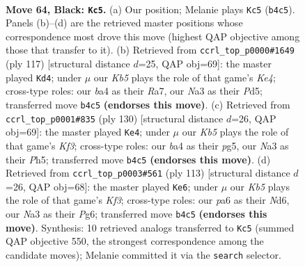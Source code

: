 \documentclass[11pt]{article}
\begin{document}
\clearpage

\begin{figure}[p]\centering
\begin{subfigure}{0.46\textwidth}\centering
\resizebox{\linewidth}{!}{%
\newchessgame
\chessboard[
  setfen={6r1/8/Pp6/5p2/Bk1R1P2/n2K4/8/8 b - - 12 64},
  showmover=false,
  pgfstyle=straightmove, color=movearrow, markmove={b4-c5}
]}
\caption{}
\end{subfigure}\hfill
\begin{subfigure}{0.46\textwidth}\centering
\resizebox{\linewidth}{!}{%
\newchessgame
\chessboard[
  setfen={8/r7/8/3pk3/7p/P3R2P/4K3/8 b - - 13 59},
  showmover=false,
  pgfstyle=straightmove, color=movearrow, markmove={e5-d4}
]}
\caption{}
\end{subfigure}
\\[4pt]
\begin{subfigure}{0.46\textwidth}\centering
\resizebox{\linewidth}{!}{%
\newchessgame
\chessboard[
  setfen={8/3r1k2/4R3/5rpP/2p5/2P2K2/8/R7 w - - 0 66},
  showmover=false,
  pgfstyle=straightmove, color=movearrow, markmove={f3-e4}
]}
\caption{}
\end{subfigure}\hfill
\begin{subfigure}{0.46\textwidth}\centering
\resizebox{\linewidth}{!}{%
\newchessgame
\chessboard[
  setfen={8/8/1K1n1kp1/8/6NP/1R6/1Pr5/8 b - - 1 57},
  showmover=false,
  pgfstyle=straightmove, color=movearrow, markmove={f6-e6}
]}
\caption{}
\end{subfigure}
\caption{\textbf{Move 64, Black: \texttt{Kc5}.} (a) Our position; Melanie plays \texttt{Kc5} (\texttt{b4c5}). Panels (b)--(d) are the retrieved master positions whose correspondence most drove this move (highest QAP objective among those that transfer to it). (b) Retrieved from \texttt{ccrl\_top\_p0000\#1649} (ply 117) [structural distance $d$=25, QAP obj=69]: the master played \texttt{Kd4}; under $\mu$ our \emph{Kb5} plays the role of that game's \emph{Ke4}; cross-type roles: our \emph{b}a4 as their \emph{R}a7, our \emph{N}a3 as their \emph{P}d5; transferred move \texttt{b4c5} \textbf{(endorses this move)}. (c) Retrieved from \texttt{ccrl\_top\_p0001\#835} (ply 130) [structural distance $d$=26, QAP obj=69]: the master played \texttt{Ke4}; under $\mu$ our \emph{Kb5} plays the role of that game's \emph{Kf3}; cross-type roles: our \emph{b}a4 as their \emph{p}g5, our \emph{N}a3 as their \emph{P}h5; transferred move \texttt{b4c5} \textbf{(endorses this move)}. (d) Retrieved from \texttt{ccrl\_top\_p0003\#561} (ply 113) [structural distance $d$=26, QAP obj=68]: the master played \texttt{Ke6}; under $\mu$ our \emph{Kb5} plays the role of that game's \emph{Kf3}; cross-type roles: our \emph{p}a6 as their \emph{N}d6, our \emph{N}a3 as their \emph{P}g6; transferred move \texttt{b4c5} \textbf{(endorses this move)}. Synthesis: 10 retrieved analogs transferred to \texttt{Kc5} (summed QAP objective 550, the strongest correspondence among the candidate moves); Melanie committed it via the \texttt{search} selector.}
\label{fig:thought-m127}
\end{figure}
\end{document}
